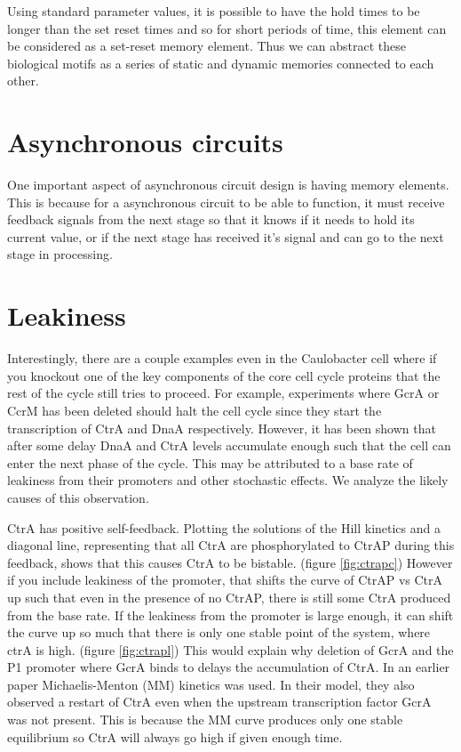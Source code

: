 \documentclass{article}
\begin{document}
\newline Using standard parameter values, it is possible to have the hold times to be longer than the set reset times and so for short periods of time, this element can be considered as a set-reset memory element.  Thus we can abstract these biological motifs as a series of static and dynamic memories connected to each other.

\section{Asynchronous circuits}
One important aspect of asynchronous circuit design is having memory elements.  This is because for a asynchronous circuit to be able to function, it must receive feedback signals from the next stage so that it knows if it needs to hold its current value, or if the next stage has received it's signal and can go to the next stage in processing.

\section{Leakiness}
Interestingly, there are a couple examples even in the Caulobacter cell where if you knockout one of the key components of the core cell cycle proteins that the rest of the cycle still tries to proceed.  For example, experiments where GcrA or CcrM has been deleted should halt the cell cycle since they start the transcription of CtrA and DnaA respectively.  However, it has been shown that after some delay DnaA and CtrA levels accumulate enough such that the cell can enter the next phase of the cycle.  This may be attributed to a base rate of leakiness from their promoters and other stochastic effects.  We analyze the likely causes of this observation.

CtrA has positive self-feedback.  Plotting the solutions of the Hill kinetics and a diagonal line, representing that all CtrA are phosphorylated to CtrAP during this feedback, shows that this causes CtrA to be bistable. (figure \ref{fig:ctrapc})  However if you include leakiness of the promoter, that shifts the curve of CtrAP vs CtrA up such that even in the presence of no CtrAP, there is still some CtrA produced from the base rate.  If the leakiness from the promoter is large enough, it can shift the curve up so much that there is only one stable point of the system, where ctrA is high. (figure \ref{fig:ctrapl}) This would explain why deletion of GcrA and the P1 promoter where GcrA binds to delays the accumulation of CtrA.  In an earlier paper \cite{compgenre} Michaelis-Menton (MM) kinetics was used.  In their model, they also observed a restart of CtrA even when the upstream transcription factor GcrA was not present.  This is because the MM curve produces only one stable equilibrium so CtrA will always go high if given enough time.
\end{document}
